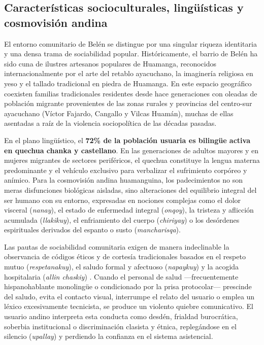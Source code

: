 \subsection{Características socioculturales, lingüísticas y cosmovisión andina}
\label{sec:2.3_social}

El entorno comunitario de Belén se distingue por una singular riqueza identitaria y una densa trama de sociabilidad popular. Históricamente, el barrio de Belén ha sido cuna de ilustres artesanos populares de Huamanga, reconocidos internacionalmente por el arte del retablo ayacuchano, la imaginería religiosa en yeso y el tallado tradicional en piedra de Huamanga. En este espacio geográfico coexisten familias tradicionales residentes desde hace generaciones con oleadas de población migrante provenientes de las zonas rurales y provincias del centro-sur ayacuchano (Víctor Fajardo, Cangallo y Vilcas Huamán), muchas de ellas asentadas a raíz de la violencia sociopolítica de las décadas pasadas.

En el plano lingüístico, el \textbf{72\% de la población usuaria es bilingüe activa en quechua chanka y castellano}. En las generaciones de adultos mayores y en mujeres migrantes de sectores periféricos, el quechua constituye la lengua materna predominante y el vehículo exclusivo para verbalizar el sufrimiento corpóreo y anímico. Para la cosmovisión andina huamanguina, los padecimientos no son meras disfunciones biológicas aisladas, sino alteraciones del equilibrio integral del ser humano con su entorno, expresadas en nociones complejas como el dolor visceral (\textit{nanay}), el estado de enfermedad integral (\textit{onqoy}), la tristeza y aflicción acumulada (\textit{llakikuy}), el enfriamiento del cuerpo (\textit{chiriyay}) o los desórdenes espirituales derivados del espanto o susto (\textit{mancharisqa}).

Las pautas de sociabilidad comunitaria exigen de manera indeclinable la observancia de códigos éticos y de cortesía tradicionales basados en el respeto mutuo (\textit{respetanakuy}), el saludo formal y afectuoso (\textit{napaykuy}) y la acogida hospitalaria (\textit{allin chaskiy}) \cite{aguirre2020}. Cuando el personal de salud —frecuentemente hispanohablante monolingüe o condicionado por la prisa protocolar— prescinde del saludo, evita el contacto visual, interrumpe el relato del usuario o emplea un léxico excesivamente tecnicista, se produce un violento quiebre comunicativo. El usuario andino interpreta esta conducta como desdén, frialdad burocrática, soberbia institucional o discriminación clasista y étnica, replegándose en el silencio (\textit{upallay}) y perdiendo la confianza en el sistema asistencial.

